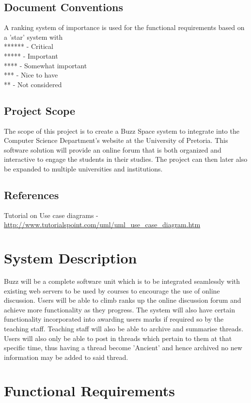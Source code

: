 \documentclass[12pt]{article}
\begin{document}
\subsection{Document Conventions}
A ranking system of importance is used for the functional requirements based on a 'star' system with 
\\****** - Critical
\\*****  - Important
\\ ****  - Somewhat important
\\  ***  - Nice to have
\\  **   - Not considered


\subsection{Project Scope}
The scope of this project is to create a Buzz Space system to integrate into the Computer Science Department's website at the University of Pretoria. This software solution will provide an online forum that is both organized and interactive to engage the students in their studies. The project can then later also be expanded to multiple universities and institutions.

\subsection{References}
Tutorial on Use case diagrams - \url{http://www.tutorialspoint.com/uml/uml_use_case_diagram.htm}

\section{System Description}
Buzz will be a complete software unit which is to be integrated seamlessly with existing web servers to be used by courses to encourage the use of online discussion. Users will be able to climb ranks up the online discussion forum and achieve more functionality as they progress. The system will also have certain functionality incorporated into awarding users marks if required so by the teaching staff. Teaching staff will also be able to archive and summarise threads. Users will also only be able to post in threads which pertain to them at that specific time, thus having a thread become 'Ancient' and hence archived no new information may be added to said thread.
\newpage %
\section{Functional Requirements}
\end{document}
